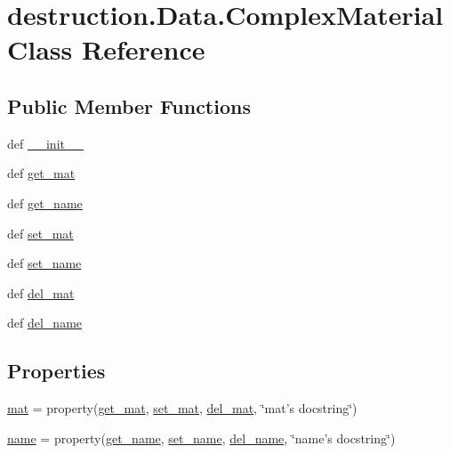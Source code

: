 \hypertarget{classdestruction_1_1_data_1_1_complex_material}{\section{destruction.\-Data.\-Complex\-Material Class Reference}
\label{classdestruction_1_1_data_1_1_complex_material}
}
\subsection*{Public Member Functions}
\begin{DoxyCompactItemize}
\item 
def \hyperlink{classdestruction_1_1_data_1_1_complex_material_a7ea2e46e6b4e1a199ac6a54e226e3d61}{\-\_\-\-\_\-init\-\_\-\-\_\-}
\item 
def \hyperlink{classdestruction_1_1_data_1_1_complex_material_a01eeeaaf39562b494d1b0361c7091253}{get\-\_\-mat}
\item 
def \hyperlink{classdestruction_1_1_data_1_1_complex_material_a0e24fb15747d14527c4a43672d3c4b59}{get\-\_\-name}
\item 
def \hyperlink{classdestruction_1_1_data_1_1_complex_material_aaca2ae0d2af38934ee91a0855acf968a}{set\-\_\-mat}
\item 
def \hyperlink{classdestruction_1_1_data_1_1_complex_material_ac2a819cb2ff52cbca54ed38f54027c89}{set\-\_\-name}
\item 
def \hyperlink{classdestruction_1_1_data_1_1_complex_material_ae799b1659e434b71349655caaf536de3}{del\-\_\-mat}
\item 
def \hyperlink{classdestruction_1_1_data_1_1_complex_material_a66475785b3dd344219edf401251c6e4d}{del\-\_\-name}
\end{DoxyCompactItemize}
\subsection*{Properties}
\begin{DoxyCompactItemize}
\item 
\hyperlink{classdestruction_1_1_data_1_1_complex_material_a253d882465e0dcf869876123bbbd91e7}{mat} = property(\hyperlink{classdestruction_1_1_data_1_1_complex_material_a01eeeaaf39562b494d1b0361c7091253}{get\-\_\-mat}, \hyperlink{classdestruction_1_1_data_1_1_complex_material_aaca2ae0d2af38934ee91a0855acf968a}{set\-\_\-mat}, \hyperlink{classdestruction_1_1_data_1_1_complex_material_ae799b1659e434b71349655caaf536de3}{del\-\_\-mat}, \char`\"{}mat's docstring\char`\"{})
\item 
\hyperlink{classdestruction_1_1_data_1_1_complex_material_adb022aee91ece74be1d0e0d01a84f082}{name} = property(\hyperlink{classdestruction_1_1_data_1_1_complex_material_a0e24fb15747d14527c4a43672d3c4b59}{get\-\_\-name}, \hyperlink{classdestruction_1_1_data_1_1_complex_material_ac2a819cb2ff52cbca54ed38f54027c89}{set\-\_\-name}, \hyperlink{classdestruction_1_1_data_1_1_complex_material_a66475785b3dd344219edf401251c6e4d}{del\-\_\-name}, \char`\"{}name's docstring\char`\"{})
\end{DoxyCompactItemize}


